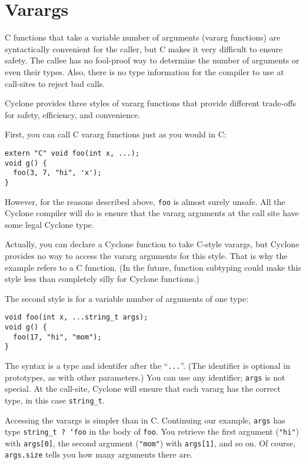 \section{Varargs}

C functions that take a variable number of arguments (vararg
functions) are syntactically convenient for the caller, but C makes it
very difficult to ensure safety.  The callee has no fool-proof way to
determine the number of arguments or even their types.  Also, there is
no type information for the compiler to use at call-sites to reject
bad calls.

Cyclone provides three styles of vararg functions that provide
different trade-offs for safety, efficiency, and convenience.

First, you can call C vararg functions just as you would in C:
\begin{verbatim}
extern "C" void foo(int x, ...);
void g() { 
  foo(3, 7, "hi", 'x');
}
\end{verbatim}
However, for the reasons described above, \texttt{foo} is almost
surely unsafe.  All the Cyclone compiler will do is ensure that the
vararg arguments at the call site have some legal Cyclone type.

Actually, you can declare a Cyclone function to take C-style varargs,
but Cyclone provides no way to access the vararg arguments for this
style.  That is why the example refers to a C function.  (In the
future, function subtyping could make this style less than completely
silly for Cyclone functions.)

The second style is for a variable number of arguments of one type:
\begin{verbatim}
void foo(int x, ...string_t args);
void g() {
  foo(17, "hi", "mom");
}
\end{verbatim}
The syntax is a type and identifer after the ``\texttt{...}''.  (The
identifier is optional in prototypes, as with other parameters.)  You
can use any identifier; \texttt{args} is not special.  At the
call-site, Cyclone will ensure that each vararg has the correct type,
in this case \texttt{string_t}.

Accessing the varargs is simpler than in C.  Continuing our example,
\texttt{args} has type \texttt{string_t ? `foo} in the body of
\texttt{foo}.  You retrieve the first argument (\texttt{"hi"}) with
\texttt{args[0]}, the second argument (\texttt{"mom"}) with
\texttt{args[1]}, and so on.  Of course, \texttt{args.size} tells you
how many arguments there are.

